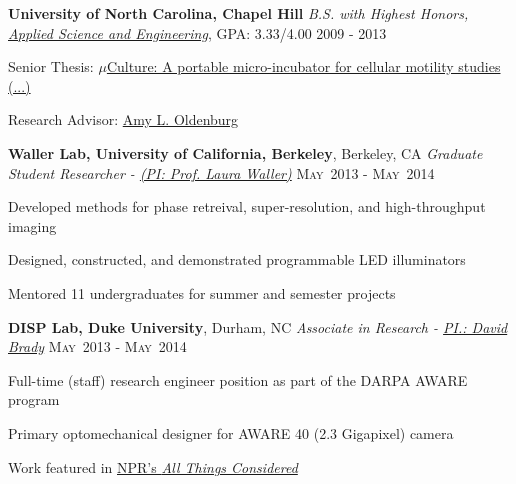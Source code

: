 \documentclass[12pt,letterpaper]{article}
\newenvironment{itemize*}%
{\begin{itemize}%
  \setlength{\itemsep}{0pt}}%
{\end{itemize}}
\newcommand{\mhead}[1]{\leavevmode\marginpar{\sffamily\footnotesize #1}}
\newcommand{\rdate}[1]{{} \hfill #1}
\begin{document}
\textbf{University of North Carolina, Chapel Hill} \newline
\emph{B.S. with Highest Honors, \href{https://www.bme.unc.edu/}{Applied Science and Engineering}}, GPA: 3.33/4.00 \rdate{2009 - 2013}
\begin{itemize*}
  \item Senior Thesis: \href{https://dl.dropbox.com/u/10724484/resume/ME492_2012_Design_Report_PulseWaterJet.pdf}{$\mu$Culture: A portable micro-incubator for cellular motility studies (...)}
  \item Research Advisor: \href{http://user.physics.unc.edu/~aold/people.htm}{Amy L. Oldenburg}
\end{itemize*}

\medskip
\mhead{Research \newline Experience}%
\textbf{Waller Lab, \textbf{University of California, Berkeley}}, Berkeley, CA \newline
\emph{Graduate Student Researcher - \href{http://www.laurawaller.com}{(PI: Prof. Laura Waller)}} \rdate{\textsc{May}~2013 - \textsc{May}~2014}
\begin{itemize*}
  \item Developed methods for phase retreival, super-resolution, and high-throughput imaging
  \item Designed, constructed, and demonstrated  programmable LED illuminators
  \item Mentored 11 undergraduates for summer and semester projects
\end{itemize*}

\smallskip
\textbf{DISP Lab, \textbf{Duke University}}, Durham, NC \newline
\emph{Associate in Research - \href{http://www.disp.duke.edu/}{PI.: David Brady} } \rdate{\textsc{May}~2013 - \textsc{May}~2014}
\begin{itemize*}
 	\item Full-time (staff) research engineer position as part of the DARPA AWARE program
	\item Primary optomechanical designer for AWARE 40 (2.3 Gigapixel) camera
	\item Work featured in \href{http://www.npr.org/2013/12/10/250000359/supercamera-more-pixels-than-you-know-what-to-do-with}{NPR's \textit{All Things Considered}}
\end{itemize*}
\end{document}
